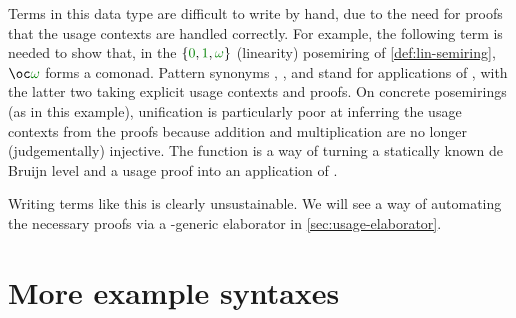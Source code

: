 Terms in this data type are difficult to write by hand, due to the
need for proofs that the usage contexts are handled correctly. For
example, the following term is needed to show that, in the $\{\gr0,
\gr1, \gr\omega\}$ (linearity) posemiring of \cref{def:lin-semiring},
$\oc\gr\omega$ forms a comonad.
Pattern synonyms ,
, and
 stand for applications of
, with the latter two taking explicit usage
contexts and proofs.
On concrete
posemirings (as in this example), unification is particularly poor at
inferring the usage contexts from the proofs because addition and
multiplication are no longer (judgementally) injective.
The function  is a way of turning a statically known de
Bruijn level and a usage proof into an application of .


 Writing terms like this
is clearly unsustainable. We will see a way of automating the
necessary proofs via a -generic elaborator in
\cref{sec:usage-elaborator}.







\section{More example syntaxes}\label{sec:other-syntaxes}


